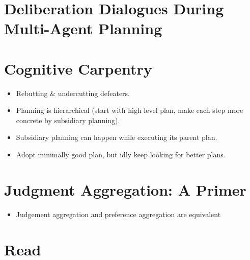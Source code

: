 \documentclass[a4paper]{article}
\begin{document}
\section{Deliberation Dialogues During Multi-Agent 
Planning\cite{dunin-keplicz2011}}

\section{Cognitive Carpentry \cite{pollock1995}}
\begin{itemize}
	\item Rebutting \& undercutting defeaters.
	\item Planning is hierarchical (start with high level plan, make each step
	more concrete by subsidiary planning).
	\item Subsidiary planning can happen while executing its parent plan.
	\item Adopt minimally good plan, but idly keep looking for better plans.
\end{itemize}

\section{Judgment Aggregation: A Primer \cite{grossi2014}}
\begin{itemize}
	\item Judgement aggregation and preference aggregation are equivalent 
	\cite[p. 52]{grossi2014}
\end{itemize}

\section{Read}
\cite{atkinson2005}
\cite{dunin-keplicz2011}
\cite{prakken2006}
\cite{mcburney2007}
\cite{mcburney2009}
\cite{medellin2012}
\cite{pollock1995}
\cite{prakken2009}
\cite{silver2005}
\cite{standley2010}
\cite{bench-capon2007}
\cite{vaneemeren2014}
\cite{verheij2016}

\nocite{*}


\end{document}
